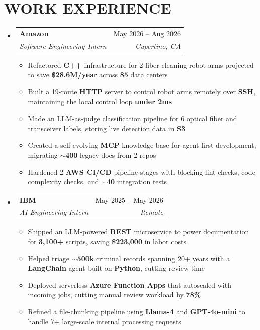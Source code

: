 \documentclass[letterpaper,11pt]{article}
\makeatletter
\newcommand{\resumeItem}[1]{
  \item\small{
    {#1 \vspace{-4pt}}
  }
}
\newcommand{\resumeSubheading}[4]{
  \item
    \begin{tabular*}{0.97\textwidth}[t]{l@{\extracolsep{\fill}}r}
      \textbf{#1} & #2 \\
      \textit{\small#3} & \textit{\small #4} \\
    \end{tabular*}\vspace{-7pt}
}
\newcommand{\resumeSubHeadingListStart}{\begin{itemize}[leftmargin=0.15in, label={}]}
\newcommand{\resumeSubHeadingListEnd}{\end{itemize}}
\newcommand{\resumeItemListStart}{\begin{itemize}}
\newcommand{\resumeItemListEnd}{\end{itemize}\vspace{-8pt}}
\makeatother
\begin{document}
\section{\textbf{WORK EXPERIENCE}}
  \resumeSubHeadingListStart
  \resumeSubheading
      {Amazon}{May 2026 -- Aug 2026}
      {Software Engineering Intern}{Cupertino, CA}
      \resumeItemListStart
        \resumeItem{Refactored \textbf{C++} infrastructure for 2 fiber-cleaning robot arms projected to save \textbf{\$28.6M/year} across \textbf{85} data centers}
        \resumeItem{Built a 19-route \textbf{HTTP} server to control robot arms remotely over \textbf{SSH}, maintaining the local control loop \textbf{under 2ms}}
        \resumeItem{Made an LLM-as-judge classification pipeline for 6 optical fiber and transceiver labels, storing live detection data in \textbf{S3}}
        \resumeItem{Created a self-evolving \textbf{MCP} knowledge base for agent-first development, migrating \textbf{$\sim$400} legacy docs from 2 repos}
        \resumeItem{Hardened 2 \textbf{AWS CI/CD} pipeline stages with blocking lint checks, code complexity checks, and \textbf{$\sim$40} integration tests}
      \resumeItemListEnd
    \resumeSubheading
      {IBM}{May 2025 -- May 2026}
      {AI Engineering Intern}{Remote}
      \resumeItemListStart
        \resumeItem{Shipped an LLM-powered \textbf{REST} microservice to power documentation for \textbf{3,100+} scripts, saving \textbf{\$223,000} in labor costs}
        \resumeItem{Helped triage \textbf{$\sim$500k} criminal records spanning 20+ years with a \textbf{LangChain} agent built on \textbf{Python}, cutting review time}
        \resumeItem{Deployed serverless \textbf{Azure Function Apps} that autoscaled with incoming jobs, cutting manual review workload by \textbf{78\%}}
        \resumeItem{Refined a file-chunking pipeline using \textbf{Llama-4} and \textbf{GPT-4o-mini} to handle 7+ large-scale internal processing requests}
      \resumeItemListEnd
  \resumeSubHeadingListEnd

\end{document}
